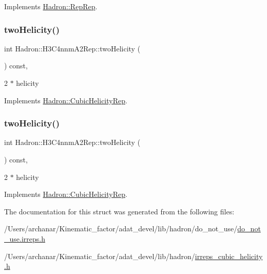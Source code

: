 Implements \mbox{\hyperlink{structHadron_1_1RepRep_ab3213025f6de249f7095892109575fde}{Hadron\+::\+Rep\+Rep}}.

\mbox{\label{structHadron_1_1H3C4nnmA2Rep_aeeec45fb753cc4ac9b6de1d24a868ab9}} 
\subsubsection{\texorpdfstring{twoHelicity()}{twoHelicity()}\hspace{0.1cm}{\footnotesize\ttfamily [1/2]}}
{\footnotesize\ttfamily int Hadron\+::\+H3\+C4nnm\+A2\+Rep\+::two\+Helicity (\begin{DoxyParamCaption}{ }\end{DoxyParamCaption}) const\hspace{0.3cm}{\ttfamily [inline]}, {\ttfamily [virtual]}}

2 $\ast$ helicity 

Implements \mbox{\hyperlink{structHadron_1_1CubicHelicityRep_af507aa56fc2747eacc8cb6c96db31ecc}{Hadron\+::\+Cubic\+Helicity\+Rep}}.

\mbox{\label{structHadron_1_1H3C4nnmA2Rep_aeeec45fb753cc4ac9b6de1d24a868ab9}} 
\subsubsection{\texorpdfstring{twoHelicity()}{twoHelicity()}\hspace{0.1cm}{\footnotesize\ttfamily [2/2]}}
{\footnotesize\ttfamily int Hadron\+::\+H3\+C4nnm\+A2\+Rep\+::two\+Helicity (\begin{DoxyParamCaption}{ }\end{DoxyParamCaption}) const\hspace{0.3cm}{\ttfamily [inline]}, {\ttfamily [virtual]}}

2 $\ast$ helicity 

Implements \mbox{\hyperlink{structHadron_1_1CubicHelicityRep_af507aa56fc2747eacc8cb6c96db31ecc}{Hadron\+::\+Cubic\+Helicity\+Rep}}.



The documentation for this struct was generated from the following files\+:\begin{DoxyCompactItemize}
\item 
/\+Users/archanar/\+Kinematic\+\_\+factor/adat\+\_\+devel/lib/hadron/do\+\_\+not\+\_\+use/\mbox{\hyperlink{do__not__use_8irreps_8h}{do\+\_\+not\+\_\+use.\+irreps.\+h}}\item 
/\+Users/archanar/\+Kinematic\+\_\+factor/adat\+\_\+devel/lib/hadron/\mbox{\hyperlink{lib_2hadron_2irreps__cubic__helicity_8h}{irreps\+\_\+cubic\+\_\+helicity.\+h}}\end{DoxyCompactItemize}
